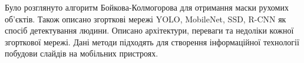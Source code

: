 \chapterConclusion

Було розглянуто алгоритм Бойкова-Колмогорова для
отримання маски рухомих об'єктів. Також описано
згорткові мережі YOLO, MobileNet, SSD, R-CNN
як спосіб детектування людини.
Описано архітектури, переваги та недоліки кожної
згорткової мережі.
Дані методи підходять для
створення інформаційної технології побудови слайдів на
мобільних пристроях.